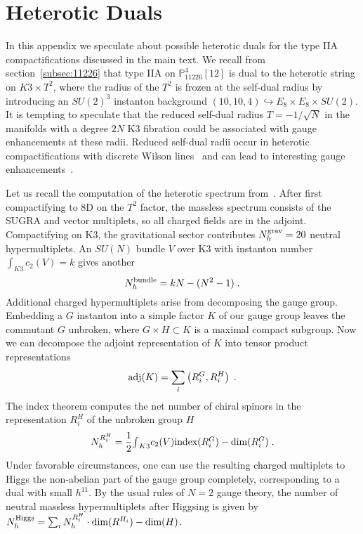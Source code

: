 \documentclass[11pt,a4paper]{article}
\numberwithin{equation}{section}
\numberwithin{table}{section}\setlength{\multlinegap}{25pt}
\begin{document}
\section{Heterotic Duals}
\label{app:HetDuals}
In this appendix we speculate about possible heterotic duals for the type IIA compactifications discussed in the main text. We recall from section~\ref{subsec:11226} that type IIA on $\mathbb{P}^4_{11226}[12]$ is dual to the heterotic string on $K3\times T^2$, where the radius of the $T^2$ is frozen at the self-dual radius by introducing an $SU(2)^3$ instanton background $(10,10,4)\hookrightarrow E_8\times E_8\times SU(2)$. It is tempting to speculate that the reduced self-dual radius $T=-1/\sqrt{N}$ in the manifolds with a degree $2N$ K3 fibration could be associated with gauge enhancements at these radii. Reduced self-dual radii occur in heterotic compactifications with discrete Wilson lines~\cite{Narain:1985jj,Narain:1986am,Polchinski:1995df} and can lead to interesting gauge enhancements~\cite{Fraiman:2018ebo,Font:2020rsk,Font:2021uyw}.



Let us recall the computation of the heterotic spectrum from~\cite{Kachru:1995wm}. After first compactifying to 8D on the $T^2$ factor, the massless spectrum consists of the SUGRA and vector multiplets, so all charged fields are in the adjoint. Compactifying on K3, the gravitational sector contributes $N_h^\textup{grav}=20$ neutral hypermultiplets. An $SU(N)$ bundle $V$ over K3 with instanton number $\textstyle{\int}_{K3}c_2(V)=k$ gives another
\begin{equation}
    N_h^\textup{bundle}=kN-(N^2-1)\;.
\end{equation}
Additional charged hypermultiplets arise from decomposing the gauge group. Embedding a $G$ instanton into a simple factor $K$ of our gauge group leaves the commutant $G$ unbroken, where $G\times H\subset K$ is a maximal compact subgroup. Now we can decompose the adjoint representation of $K$ into tensor product representations
\begin{equation}
    \textup{adj}(K)=\sum_i\left(R^G_i,R^H_i\right)\;.
\end{equation}
The index theorem computes the net number of chiral spinors in the representation $R^H_i$ of the unbroken group $H$
\begin{equation}
    \label{eq:IndexFormula}
    N_h^{R^H_i}=\frac{1}{2}\textstyle{\int}_{K3}c_2(V)\textup{index}(R^G_i)-\textup{dim}(R^G_i)\;.
\end{equation}
Under favorable circumstances, one can use the resulting charged multiplets to Higgs the non-abelian part of the gauge group completely, corresponding to a dual with small $h^{11}$. By the usual rules of $N=2$ gauge theory, the number of neutral massless hypermultiplets after Higgsing is given by $N_h^\textup{Higgs}=\sum_iN_h^{R^H_i}\cdot \textup{dim}(R^{H_i})-\textup{dim}(H)$.
\end{document}
